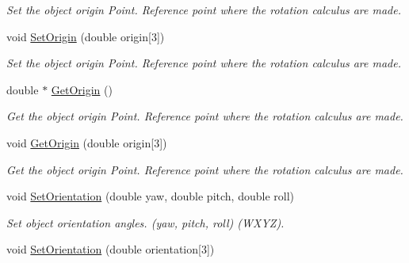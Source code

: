 \begin{DoxyCompactItemize}
\begin{DoxyCompactList}\small\item\em Set the object origin Point. Reference point where the rotation calculus are made. \item\end{DoxyCompactList}\item 
\hypertarget{classvtkScenarioItem_a9d7677711458629579e7cac7594af341}{
void \hyperlink{classvtkScenarioItem_a9d7677711458629579e7cac7594af341}{SetOrigin} (double origin\mbox{[}3\mbox{]})}
\label{classvtkScenarioItem_a9d7677711458629579e7cac7594af341}

\begin{DoxyCompactList}\small\item\em Set the object origin Point. Reference point where the rotation calculus are made. \item\end{DoxyCompactList}\item 
\hypertarget{classvtkScenarioItem_aaf647b14f09405367835eb9585456d4c}{
double $\ast$ \hyperlink{classvtkScenarioItem_aaf647b14f09405367835eb9585456d4c}{GetOrigin} ()}
\label{classvtkScenarioItem_aaf647b14f09405367835eb9585456d4c}

\begin{DoxyCompactList}\small\item\em Get the object origin Point. Reference point where the rotation calculus are made. \item\end{DoxyCompactList}\item 
\hypertarget{classvtkScenarioItem_a82c77d1cbae1b9735ef0dcbfa59d1e5a}{
void \hyperlink{classvtkScenarioItem_a82c77d1cbae1b9735ef0dcbfa59d1e5a}{GetOrigin} (double origin\mbox{[}3\mbox{]})}
\label{classvtkScenarioItem_a82c77d1cbae1b9735ef0dcbfa59d1e5a}

\begin{DoxyCompactList}\small\item\em Get the object origin Point. Reference point where the rotation calculus are made. \item\end{DoxyCompactList}\item 
\hypertarget{classvtkScenarioItem_a026e114a0221d67218b1bd0fc7bd155d}{
void \hyperlink{classvtkScenarioItem_a026e114a0221d67218b1bd0fc7bd155d}{SetOrientation} (double yaw, double pitch, double roll)}
\label{classvtkScenarioItem_a026e114a0221d67218b1bd0fc7bd155d}

\begin{DoxyCompactList}\small\item\em Set object orientation angles. (yaw, pitch, roll) (WXYZ). \item\end{DoxyCompactList}\item 
\hypertarget{classvtkScenarioItem_a9ee0114bd902d31a0bf11bc4f72e9587}{
void \hyperlink{classvtkScenarioItem_a9ee0114bd902d31a0bf11bc4f72e9587}{SetOrientation} (double orientation\mbox{[}3\mbox{]})}
\label{classvtkScenarioItem_a9ee0114bd902d31a0bf11bc4f72e9587}


\end{DoxyCompactItemize}
